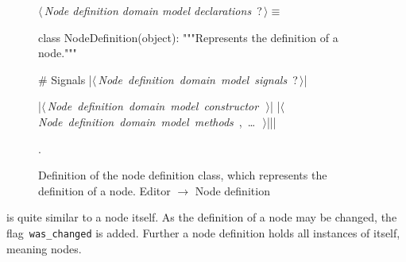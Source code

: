 \documentclass[%
    a4paper,    %
    justified,  %
    nobib,      %
    openany     %
]{tufte-book}
\makeatletter
\renewcommand{\label}[1]{\@tufte@label{##1}}%
\makeatother
\begin{document}
\begin{figure}
\begin{flushleft} \small
\begin{minipage}{\linewidth}\label{scrap120}\raggedright\small
{} $\langle\,${\itshape Node definition domain model declarations}\nobreak\ {\footnotesize {?}}$\,\rangle\equiv$
\vspace{-1ex}
\begin{pythoncode}
class NodeDefinition(object):
    """Represents the definition of a node."""

    # Signals
    |\hbox{$\langle\,${\itshape Node definition domain model signals}\nobreak\ {\footnotesize ?}$\,\rangle$}|

    |\hbox{$\langle\,${\itshape Node definition domain model constructor}\nobreak\ {\footnotesize {}}$\,\rangle$}|
    |\hbox{$\langle\,${\itshape Node definition domain model methods}\nobreak\ {\footnotesize {}, \ldots\ }$\,\rangle$}||\NWsep|
\end{pythoncode}
\vspace{1.5ex}
\footnotesize
\begin{list}{}{\setlength{\itemsep}{-\parsep}\setlength{\itemindent}{-\leftmargin}}
\item {\NWtxtMacroNoRef}.

\item{}
\end{list}
\end{minipage}\vspace{4ex}
\end{flushleft}
\caption{Definition of the node definition class, which represents the definition
  of a node.
  \newline{}\newline{}Editor $\rightarrow$ Node definition}
\label{editor:lst:node-definition}
\end{figure}

 is quite similar to a node itself. As the
definition of a node may be changed, the flag~\verb=was_changed= is added.
Further a node definition holds all instances of itself, meaning nodes.
\end{document}
